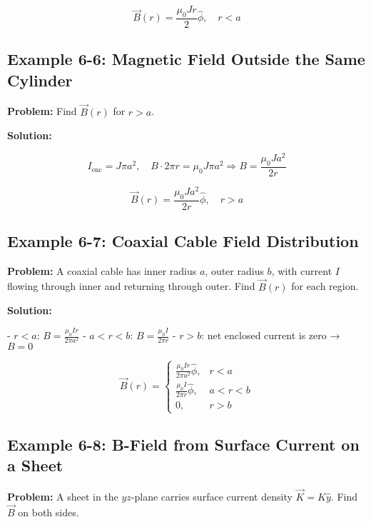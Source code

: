 \documentclass[12pt]{article}
\begin{document}
\begin{tcolorbox}
\[
\boxed{\vec{B}(r) = \frac{\mu_0 J r}{2} \hat{\phi}}, \quad r < a
\]
\end{tcolorbox}

\subsection*{Example 6-6: Magnetic Field Outside the Same Cylinder}

\textbf{Problem:}  
Find \( \vec{B}(r) \) for \( r > a \).

\textbf{Solution:}

\[
I_{\text{enc}} = J \pi a^2, \quad B \cdot 2\pi r = \mu_0 J \pi a^2
\Rightarrow B = \frac{\mu_0 J a^2}{2r}
\]

\begin{tcolorbox}
\[
\boxed{\vec{B}(r) = \frac{\mu_0 J a^2}{2r} \hat{\phi}}, \quad r > a
\]
\end{tcolorbox}

\subsection*{Example 6-7: Coaxial Cable Field Distribution}

\textbf{Problem:}  
A coaxial cable has inner radius \( a \), outer radius \( b \), with current \( I \) flowing through inner and returning through outer. Find \( \vec{B}(r) \) for each region.

\textbf{Solution:}

- \( r < a \): \( B = \frac{\mu_0 I r}{2\pi a^2} \)
- \( a < r < b \): \( B = \frac{\mu_0 I}{2\pi r} \)
- \( r > b \): net enclosed current is zero → \( B = 0 \)

\begin{tcolorbox}
\[
\boxed{
\vec{B}(r) =
\begin{cases}
\frac{\mu_0 I r}{2\pi a^2} \hat{\phi}, & r < a \\
\frac{\mu_0 I}{2\pi r} \hat{\phi}, & a < r < b \\
0, & r > b
\end{cases}
}
\]
\end{tcolorbox}

\subsection*{Example 6-8: B-Field from Surface Current on a Sheet}

\textbf{Problem:}  
A sheet in the \( yz \)-plane carries surface current density \( \vec{K} = K \hat{y} \). Find \( \vec{B} \) on both sides.
\end{document}
